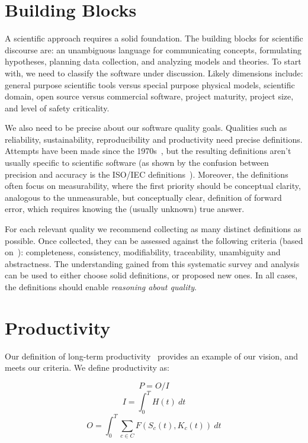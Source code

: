 \documentclass[sigconf, authorversion, nonacm]{acmart}
\begin{document}
\section{Building Blocks}

A scientific approach requires a solid foundation.  The building blocks for
scientific discourse are: an unambiguous language for communicating concepts,
formulating hypotheses, planning data collection, and analyzing models and
theories.  To start with, we need to classify the software under discussion.
Likely dimensions include: general purpose scientific tools versus special
purpose physical models, scientific domain, open source versus commercial
software, project maturity, project size, and level of safety criticality.

We also need to be precise about our software quality goals. Qualities
such as reliability, sustainability, reproducibility and productivity need
precise definitions. Attempts have been made since the
1970s~\cite{McCallEtAl1977}, but the resulting definitions aren't usually
specific to scientific software (as shown by the confusion between precision
and accuracy is the ISO/IEC definitions~\cite{ISO9126}). Moreover, the
definitions often focus on measurability, where the first priority should be
conceptual clarity, analogous to the unmeasurable, but conceptually clear,
definition of forward error, which requires knowing the (usually unknown) true
answer.

For each relevant quality we recommend collecting as many distinct
definitions as possible.  Once collected, they can be
assessed against the following criteria (based on~\citet{IEEE1998}):
completeness, consistency, modifiability, traceability, unambiguity and
abstractness. The understanding gained from this systematic survey and analysis
can be used to either choose solid definitions, or proposed new ones.
In all cases, the definitions should enable \emph{reasoning about quality}.

\section{Productivity}

Our definition of long-term productivity~\cite{SmithAndCarette2020arXiv}
provides an example of our vision, and meets our criteria.
We define productivity as:

$$P = O / I$$ 
$$ I = \int_{0}^{T} H(t)\ dt $$
$$ O = \int_{0}^{T} \sum_{c \in C} F(S_c(t), K_c(t))\ dt $$
\end{document}
